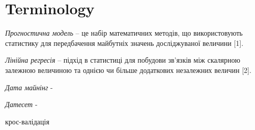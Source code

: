 \section{Terminology}
\textit{Прогностична модель} – це набір математичних методів, що використовують статистику для передбачення майбутніх значень досліджуваної величини [1]. 

\textit{Лінійна регресія} – підхід в статистиці для побудови зв’язків між скалярною залежною величиною та однією чи більше додаткових незалежних величин [2].

\textit{Дата майнінг} -

\textit{Датесет} - 

крос-валідація

